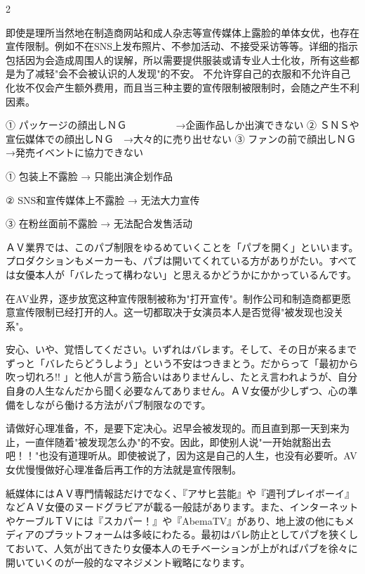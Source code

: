 \documentclass[12pt,UTF8]{ctexbook}
\begin{document}
\begin{paracol}{2}
\switchcolumn

即使是理所当然地在制造商网站和成人杂志等宣传媒体上露脸的单体女优，也存在宣传限制。例如不在SNS上发布照片、不参加活动、不接受采访等等。详细的指示包括因为会造成周围人的误解，所以需要提供服装或请专业人士化妆，所有这些都是为了减轻"会不会被认识的人发现"的不安。 不允许穿自己的衣服和不允许自己化妆不仅会产生额外费用，而且当三种主要的宣传限制被限制时，会随之产生不利因素。

\switchcolumn*

①
 パッケージの顔出しＮＧ　　　　　→企画作品しか出演できない
②
 ＳＮＳや宣伝媒体での顔出しＮＧ　→大々的に売り出せない
③
 ファンの前で顔出しＮＧ　　　　　→発売イベントに協力できない

\switchcolumn

① 包装上不露脸 → 只能出演企划作品

② SNS和宣传媒体上不露脸 → 无法大力宣传

③ 在粉丝面前不露脸 → 无法配合发售活动

\switchcolumn*

ＡＶ業界では、このパブ制限をゆるめていくことを「パブを開く」といいます。プロダクションもメーカーも、パブは開いてくれている方がありがたい。すべては女優本人が「バレたって構わない」と思えるかどうかにかかっているんです。

\switchcolumn

在AV业界，逐步放宽这种宣传限制被称为"打开宣传"。制作公司和制造商都更愿意宣传限制已经打开的人。这一切都取决于女演员本人是否觉得"被发现也没关系"。

\switchcolumn*

安心、いや、覚悟してください。いずれはバレます。そして、その日が来るまでずっと「バレたらどうしよう」という不安はつきまとう。だからって「最初から吹っ切れろ!! 」と他人が言う筋合いはありませんし、たとえ言われようが、自分自身の人生なんだから聞く必要なんてありません。ＡＶ女優が少しずつ、心の準備をしながら働ける方法がパブ制限なのです。

\switchcolumn

请做好心理准备，不，是要下定决心。迟早会被发现的。而且直到那一天到来为止，一直伴随着"被发现怎么办"的不安。因此，即使别人说"一开始就豁出去吧！！"也没有道理听从。即使被说了，因为这是自己的人生，也没有必要听。AV女优慢慢做好心理准备后再工作的方法就是宣传限制。

\switchcolumn*

紙媒体にはＡＶ専門情報誌だけでなく、『アサヒ芸能』や『週刊プレイボーイ』などＡＶ女優のヌードグラビアが載る一般誌があります。また、インターネットやケーブルＴＶには『スカパー！』や『AbemaTV』があり、地上波の他にもメディアのプラットフォームは多岐にわたる。最初はバレ防止としてパブを狭くしておいて、人気が出てきたり女優本人のモチベーションが上がればパブを徐々に開いていくのが一般的なマネジメント戦略になります。


\end{paracol}
\end{document}
